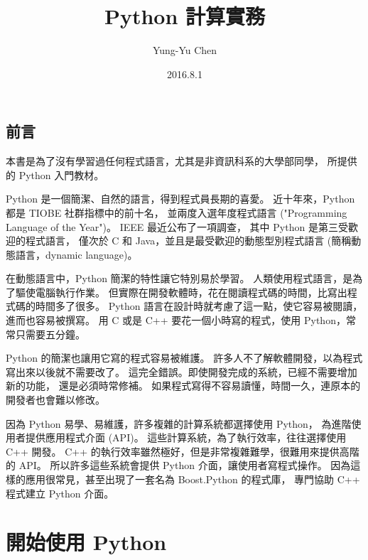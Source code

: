 \documentclass[a4paper,12pt]{book}
\theoremstyle{definition}
\begin{document}
\title{Python 計算實務}
\author{Yung-Yu Chen}
\date{2016.8.1}

\maketitle

\tableofcontents

\hspace{.5cm}

\frontmatter

\chapter*{前言}

本書是為了沒有學習過任何程式語言，尤其是非資訊科系的大學部同學，
所提供的 Python 入門教材。

Python 是一個簡潔、自然的語言，得到程式員長期的喜愛。
近十年來，Python 都是 TIOBE 社群指標\cite{tiobe_index}中的前十名，
並兩度入選年度程式語言 ("Programming Language of the Year")。
IEEE 最近公布了一項調查\cite{ieee_pl_2016}，
其中 Python 是第三受歡迎的程式語言，
僅次於 C 和 Java，並且是最受歡迎的動態型別程式語言
(簡稱動態語言，dynamic language)。

在動態語言中，Python 簡潔的特性讓它特別易於學習。
人類使用程式語言，是為了驅使電腦執行作業。
但實際在開發軟體時，花在閱讀程式碼的時間，比寫出程式碼的時間多了很多。
Python 語言在設計時就考慮了這一點，使它容易被閱讀，進而也容易被撰寫。
用 C 或是 C++ 要花一個小時寫的程式，使用 Python，常常只需要五分鐘。

Python 的簡潔也讓用它寫的程式容易被維護。
許多人不了解軟體開發，以為程式寫出來以後就不需要改了。
這完全錯誤。即使開發完成的系統，已經不需要增加新的功能，
還是必須時常修補。
如果程式寫得不容易讀懂，時間一久，連原本的開發者也會難以修改。

因為 Python 易學、易維護，許多複雜的計算系統都選擇使用 Python，
為進階使用者提供應用程式介面 (API)。
這些計算系統，為了執行效率，往往選擇使用 C++ 開發。
C++ 的執行效率雖然極好，但是非常複雜難學，很難用來提供高階的 API。
所以許多這些系統會提供 Python 介面，讓使用者寫程式操作。
因為這樣的應用很常見，甚至出現了一套名為 Boost.Python 的程式庫，
專門協助 C++ 程式建立 Python 介面。

\mainmatter

\part{開始使用 Python}
\end{document}
